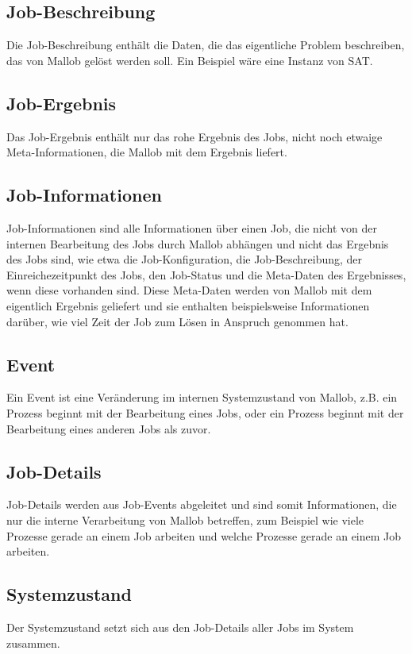     
\subsection{Job-Beschreibung}
\label{B:Job-Beschreibung}
Die Job-Beschreibung enthält die Daten, die das eigentliche Problem beschreiben, das von Mallob gelöst werden soll. Ein Beispiel wäre eine Instanz von \gls{SAT}.

\subsection{Job-Ergebnis}
\label{B:Job-Ergebnis}
Das Job-Ergebnis enthält nur das rohe Ergebnis des Jobs, nicht noch etwaige Meta-Informationen, die Mallob mit dem Ergebnis liefert.

\subsection{Job-Informationen}
\label{B:Job-Informationen}
Job-Informationen sind alle Informationen über einen Job, die nicht von der internen Bearbeitung des Jobs durch Mallob abhängen und nicht das Ergebnis des Jobs sind, wie etwa die Job-Konfiguration, die Job-Beschreibung, der Einreichezeitpunkt des Jobs, den Job-Status und die Meta-Daten des Ergebnisses, wenn diese vorhanden sind. Diese Meta-Daten werden von Mallob mit dem eigentlich Ergebnis geliefert und sie enthalten beispielsweise Informationen darüber, wie viel Zeit der Job zum Lösen in Anspruch genommen hat.

\subsection{Event}
\label{B:Event}
Ein Event ist eine Veränderung im internen Systemzustand von Mallob, z.B. ein Prozess beginnt mit der Bearbeitung eines Jobs, oder ein Prozess beginnt mit der Bearbeitung eines anderen Jobs als zuvor. 

\subsection{Job-Details}
\label{B:Job-Details}
Job-Details werden aus Job-Events abgeleitet und sind somit Informationen, die nur die interne Verarbeitung von Mallob betreffen, zum Beispiel wie viele Prozesse gerade an einem Job arbeiten und welche Prozesse gerade an einem Job arbeiten. 

\subsection{Systemzustand}
\label{B:Systemzustand}
Der Systemzustand setzt sich aus den Job-Details aller Jobs im System zusammen.

